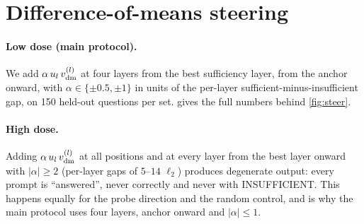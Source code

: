 \section{Difference-of-means steering}
\label{app:steer-dm}
\paragraph{Low dose (main protocol).} We add $\alpha\,u_l\,v_{\mathrm{dm}}^{(l)}$ at four layers from the best sufficiency layer, from the anchor onward, with $\alpha\in\{\pm0.5,\pm1\}$ in units of the per-layer sufficient-minus-insufficient gap, on 150 held-out questions per set.  gives the full numbers behind \cref{fig:steer}.
\begin{table}[t]
\centering\small
\setlength{\tabcolsep}{4pt}

\caption{Low-dose steering along $\vdm$ (150 held-out questions per set). Baselines ($\alpha=0$) appear in \cref{fig:steer}.}
\label{tab:steer}
\end{table}

\paragraph{High dose.} Adding $\alpha\,u_l\,v_{\mathrm{dm}}^{(l)}$ at all positions and at every layer from the best layer onward with $|\alpha|\ge2$ (per-layer gaps of $5$--$14$ $\ell_2$) produces degenerate output: every prompt is ``answered'', never correctly and never with INSUFFICIENT. This happens equally for the probe direction and the random control, and is why the main protocol uses four layers, anchor onward and $|\alpha|\le1$.
